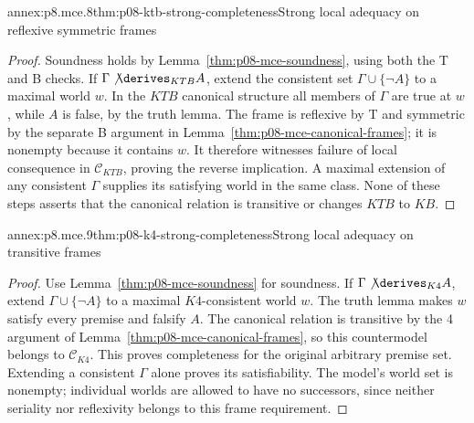\begin{annexitem}{annex:p8.mce.8}{thm:p08-ktb-strong-completeness}{Strong local adequacy on reflexive symmetric frames}
\begin{proof}
Soundness holds by Lemma~\ref{thm:p08-mce-soundness}, using both the
T and B checks. If \(\Gamma\not\derives_{KTB}A\), extend the
consistent set \(\Gamma\cup\{\neg A\}\) to a maximal world
\(w\). In the \(KTB\) canonical structure all members of
\(\Gamma\) are true at \(w\), while \(A\) is false, by the
truth lemma. The frame is reflexive by T and symmetric by the separate
B argument in Lemma~\ref{thm:p08-mce-canonical-frames}; it is nonempty
because it contains \(w\). It therefore witnesses failure of local
consequence in \(\mathcal C_{KTB}\), proving the reverse implication.
A maximal extension of any consistent \(\Gamma\) supplies its
satisfying world in the same class. None of these steps asserts that
the canonical relation is transitive or changes \(KTB\) to \(KB\).
\end{proof}
\end{annexitem}

\begin{annexitem}{annex:p8.mce.9}{thm:p08-k4-strong-completeness}{Strong local adequacy on transitive frames}
\begin{proof}
Use Lemma~\ref{thm:p08-mce-soundness} for soundness. If
\(\Gamma\not\derives_{K4}A\), extend
\(\Gamma\cup\{\neg A\}\) to a maximal \(K4\)-consistent world
\(w\). The truth lemma makes \(w\) satisfy every premise and
falsify \(A\). The canonical relation is transitive by the 4 argument
of Lemma~\ref{thm:p08-mce-canonical-frames}, so this countermodel belongs
to \(\mathcal C_{K4}\). This proves completeness for the original
arbitrary premise set. Extending a consistent \(\Gamma\) alone proves
its satisfiability. The model's world set is nonempty; individual worlds
are allowed to have no successors, since neither seriality nor reflexivity
belongs to this frame requirement.
\end{proof}
\end{annexitem}

